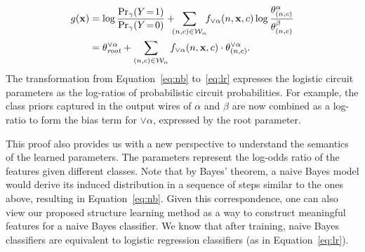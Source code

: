 \documentclass[letterpaper]{article} %
\newcommand{\sample}{{\bf x}}
\begin{document}
\begin{align}
g(\sample)&= \log\frac{\Pr_\gamma(Y\!=\!1)}{\Pr_\gamma(Y\!=\!0)} + \!\!\!\sum_{(n,c) \in \mathcal{W}_{\alpha}} \!\!  f_{\lor \alpha}(n,\sample,c) \log \frac{\theta^\alpha_{(n,c)}}{\theta^\beta_{(n,c)}}  \label{eq:nb}\\
&=\theta^{\lor \alpha}_{\mathit{root}} + \sum_{(n,c) \in \mathcal{W}_{\alpha}}f_{\lor \alpha}(n,\sample,c) \cdot \theta_{(n,c)}^{\lor \alpha}. \label{eq:lr}
\end{align}
The transformation from Equation~\ref{eq:nb} to~\ref{eq:lr} expresses the logistic circuit parameters as the  log-ratios of probabilistic circuit probabilities.
For example, the class priors captured in the output wires of $\alpha$ and $\beta$ are now combined as a log-ratio to form the bias term for $\lor \alpha$, expressed by the root parameter.

This proof also provides us with a new perspective to understand the semantics of the learned parameters.
The parameters represent the log-odds ratio of the features given different classes. Note that by Bayes' theorem, a naive Bayes model would derive its induced distribution in a sequence of steps similar to the ones above, resulting in Equation~\ref{eq:nb}. Given this correspondence, one can also view our proposed structure learning method as a way to construct meaningful features for a naive Bayes classifier. We know that after training, naive Bayes classifiers are equivalent to logistic regression classifiers (as in Equation~\ref{eq:lr}).



\vspace{-0.80mm}
\end{document}
